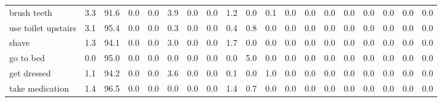 \documentclass{article}
\begin{document}
\begin{sideways}
\begin{tabular}{lrrrrrrrrrrrrrrrrrr}
brush teeth                   &         3.3 &               91.6 &           0.0 &                          0.0 &                3.9 &                0.0 &                        0.0 &          1.2 &              0.0 &                0.1 &                    0.0 &                      0.0 &                  0.0 &                   0.0 &              0.0 &              0.0 &                                  0.0 &          0.0 \\
use toilet upstairs           &         3.1 &               95.4 &           0.0 &                          0.0 &                0.3 &                0.0 &                        0.0 &          0.4 &              0.8 &                0.0 &                    0.0 &                      0.0 &                  0.0 &                   0.0 &              0.0 &              0.0 &                                  0.0 &          0.0 \\
shave                         &         1.3 &               94.1 &           0.0 &                          0.0 &                3.0 &                0.0 &                        0.0 &          1.7 &              0.0 &                0.0 &                    0.0 &                      0.0 &                  0.0 &                   0.0 &              0.0 &              0.0 &                                  0.0 &          0.0 \\
go to bed                     &         0.0 &               95.0 &           0.0 &                          0.0 &                0.0 &                0.0 &                        0.0 &          0.0 &              5.0 &                0.0 &                    0.0 &                      0.0 &                  0.0 &                   0.0 &              0.0 &              0.0 &                                  0.0 &          0.0 \\
get dressed                   &         1.1 &               94.2 &           0.0 &                          0.0 &                3.6 &                0.0 &                        0.0 &          0.1 &              0.0 &                1.0 &                    0.0 &                      0.0 &                  0.0 &                   0.0 &              0.0 &              0.0 &                                  0.0 &          0.0 \\
take medication               &         1.4 &               96.5 &           0.0 &                          0.0 &                0.0 &                0.0 &                        0.0 &          1.4 &              0.7 &                0.0 &                    0.0 &                      0.0 &                  0.0 &                   0.0 &              0.0 &              0.0 &                                  0.0 &          0.0 \\

\end{tabular}
\end{sideways}
\end{document}
